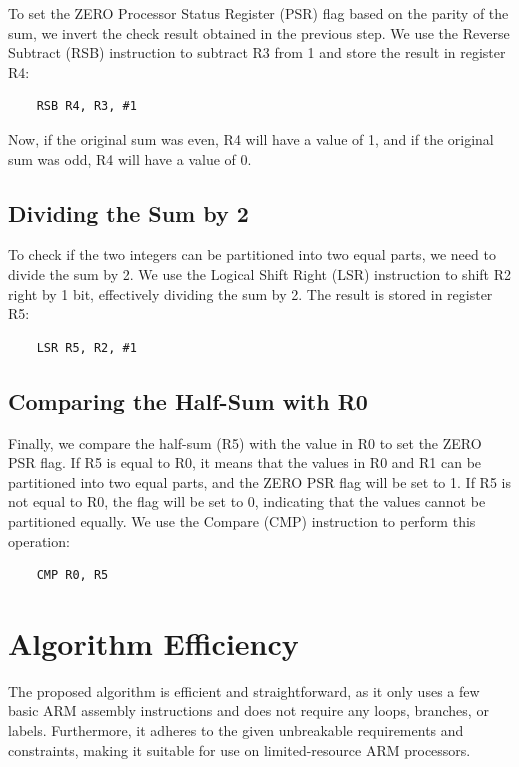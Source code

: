 To set the ZERO Processor Status Register (PSR) flag based on the parity of the sum, we invert the check result obtained in the previous step. We use the Reverse Subtract (RSB) instruction to subtract R3 from 1 and store the result in register R4:

\begin{verbatim}
    RSB R4, R3, #1
\end{verbatim}

Now, if the original sum was even, R4 will have a value of 1, and if the original sum was odd, R4 will have a value of 0.

\subsection{Dividing the Sum by 2}

To check if the two integers can be partitioned into two equal parts, we need to divide the sum by 2. We use the Logical Shift Right (LSR) instruction to shift R2 right by 1 bit, effectively dividing the sum by 2. The result is stored in register R5:

\begin{verbatim}
    LSR R5, R2, #1
\end{verbatim}

\subsection{Comparing the Half-Sum with R0}

Finally, we compare the half-sum (R5) with the value in R0 to set the ZERO PSR flag. If R5 is equal to R0, it means that the values in R0 and R1 can be partitioned into two equal parts, and the ZERO PSR flag will be set to 1. If R5 is not equal to R0, the flag will be set to 0, indicating that the values cannot be partitioned equally. We use the Compare (CMP) instruction to perform this operation:

\begin{verbatim}
    CMP R0, R5
\end{verbatim}

\section{Algorithm Efficiency}

The proposed algorithm is efficient and straightforward, as it only uses a few basic ARM assembly instructions and does not require any loops, branches, or labels. Furthermore, it adheres to the given unbreakable requirements and constraints, making it suitable for use on limited-resource ARM processors.

